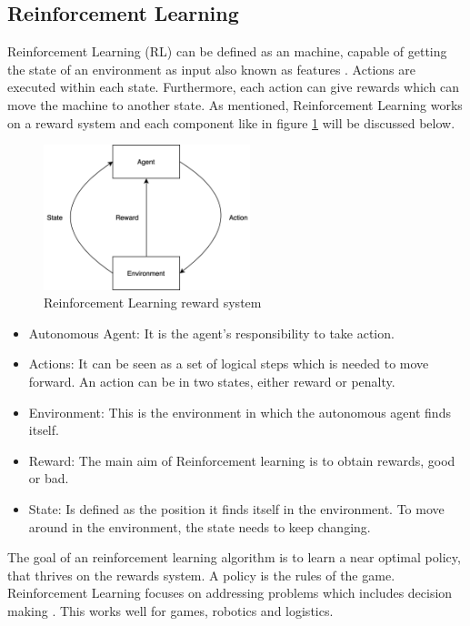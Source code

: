 \subsection{Reinforcement Learning}
Reinforcement Learning (RL) can be defined as an machine, capable of getting the state of an environment as input also known as features \cite{DBLP:journals/corr/abs-1806-08894}.
Actions are executed within each state. Furthermore, each action can give rewards which can move the machine to another state. As mentioned, Reinforcement Learning works on a reward system and each component like in figure \ref{fig:RLreward} will be discussed below.
\begin{figure}[htbp]
\centering
\includegraphics[width=6cm]{./figures/reinforce7.png}
\caption{Reinforcement Learning reward system \protect\cite{sebastiani2002machine}}
\label{fig:RLreward}
\end{figure}
\begin{itemize}
  \item Autonomous Agent: It is the agent's responsibility to take action.
  \item Actions: It can be seen as a set of logical steps which is needed to move forward. An action can be in two states, either reward or penalty.
  \item Environment: This is the environment in which the autonomous agent finds itself.
  \item Reward: The main aim of Reinforcement learning is to obtain rewards, good or bad.
  \item State: Is defined as the position it finds itself in the environment. To move around in the environment, the state needs to keep changing.
\end{itemize}
The goal of an reinforcement learning algorithm is to learn a near optimal policy, that thrives on the rewards system. A policy is the rules of the game. Reinforcement Learning focuses on addressing problems which includes decision making  \cite{Andriybook2019}. This works well for games, robotics and logistics.

